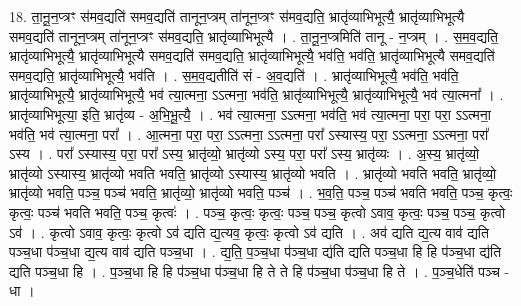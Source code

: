 \documentclass[17pt]{extarticle}
\begin{document}
18. ता॒नू॒न॒प्त्रꣳ स॑मव॒द्यति॑ समव॒द्यति॑ तानून॒प्त्रम् ता॑नून॒प्त्रꣳ स॑मव॒द्यति॒ भ्रातृ॑व्याभिभूत्यै॒ भ्रातृ॑व्याभिभूत्यै समव॒द्यति॑ तानून॒प्त्रम् ता॑नून॒प्त्रꣳ स॑मव॒द्यति॒ भ्रातृ॑व्याभिभूत्यै । . ता॒नू॒न॒प्त्रमिति॑ तानू - न॒प्त्रम् । . स॒म॒व॒द्यति॒ भ्रातृ॑व्याभिभूत्यै॒ भ्रातृ॑व्याभिभूत्यै समव॒द्यति॑ समव॒द्यति॒ भ्रातृ॑व्याभिभूत्यै॒ भव॑ति॒ भव॑ति॒ भ्रातृ॑व्याभिभूत्यै समव॒द्यति॑ समव॒द्यति॒ भ्रातृ॑व्याभिभूत्यै॒ भव॑ति । . स॒म॒व॒द्यतीति॑ सं - अ॒व॒द्यति॑ । . भ्रातृ॑व्याभिभूत्यै॒ भव॑ति॒ भव॑ति॒ भ्रातृ॑व्याभिभूत्यै॒ भ्रातृ॑व्याभिभूत्यै॒ भव॑ त्या॒त्मना॒ ऽऽत्मना॒ भव॑ति॒ भ्रातृ॑व्याभिभूत्यै॒ भ्रातृ॑व्याभिभूत्यै॒ भव॑ त्या॒त्मना᳚ । . भ्रातृ॑व्याभिभूत्या॒ इति॒ भ्रातृ॑व्य - अ॒भि॒भू॒त्यै॒ । . भव॑ त्या॒त्मना॒ ऽऽत्मना॒ भव॑ति॒ भव॑ त्या॒त्मना॒ परा॒ परा॒ ऽऽत्मना॒ भव॑ति॒ भव॑ त्या॒त्मना॒ परा᳚ । . आ॒त्मना॒ परा॒ परा॒ ऽऽत्मना॒ ऽऽत्मना॒ परा᳚ ऽस्यास्य॒ परा॒ ऽऽत्मना॒ ऽऽत्मना॒ परा᳚ ऽस्य । . परा᳚ ऽस्यास्य॒ परा॒ परा᳚ ऽस्य॒ भ्रातृ॑व्यो॒ भ्रातृ॑व्यो ऽस्य॒ परा॒ परा᳚ ऽस्य॒ भ्रातृ॑व्यः । . अ॒स्य॒ भ्रातृ॑व्यो॒ भ्रातृ॑व्यो ऽस्यास्य॒ भ्रातृ॑व्यो भवति भवति॒ भ्रातृ॑व्यो ऽस्यास्य॒ भ्रातृ॑व्यो भवति । . भ्रातृ॑व्यो भवति भवति॒ भ्रातृ॑व्यो॒ भ्रातृ॑व्यो भवति॒ पञ्च॒ पञ्च॑ भवति॒ भ्रातृ॑व्यो॒ भ्रातृ॑व्यो भवति॒ पञ्च॑ । . भ॒व॒ति॒ पञ्च॒ पञ्च॑ भवति भवति॒ पञ्च॒ कृत्वः॒ कृत्वः॒ पञ्च॑ भवति भवति॒ पञ्च॒ कृत्वः॑ । . पञ्च॒ कृत्वः॒ कृत्वः॒ पञ्च॒ पञ्च॒ कृत्वो ऽवाव॒ कृत्वः॒ पञ्च॒ पञ्च॒ कृत्वो ऽव॑ । . कृत्वो ऽवाव॒ कृत्वः॒ कृत्वो ऽव॑ द्यति द्य॒त्यव॒ कृत्वः॒ कृत्वो ऽव॑ द्यति । . अव॑ द्यति द्य॒त्य वाव॑ द्यति पञ्च॒धा प॑ञ्च॒धा द्य॒त्य वाव॑ द्यति पञ्च॒धा । . द्य॒ति॒ प॒ञ्च॒धा प॑ञ्च॒धा द्य॑ति द्यति पञ्च॒धा हि हि प॑ञ्च॒धा द्य॑ति द्यति पञ्च॒धा हि । . प॒ञ्च॒धा हि हि प॑ञ्च॒धा प॑ञ्च॒धा हि ते ते हि प॑ञ्च॒धा प॑ञ्च॒धा हि ते । . प॒ञ्च॒धेति॑ पञ्च - धा । \newline
\end{document}
